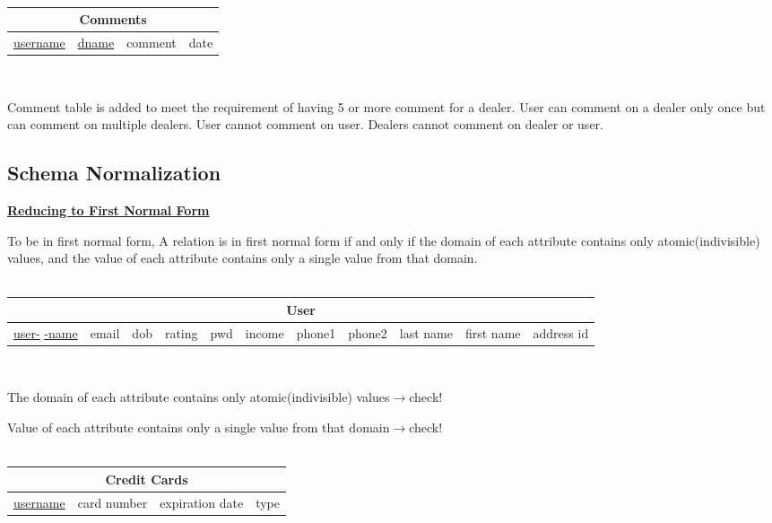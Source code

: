 \documentclass[12pt]{article}
\begin{document}
~\\
\begin{tabularx}{\textwidth}{|X|X|X|X|}
\hline
\multicolumn{4}{|c|}{\cellcolor{green!25}Comments}\\\hline
\cellcolor{green!25}\underline{username} & \cellcolor{green!25}\underline{dname} & \cellcolor{green!25}comment & \cellcolor{green!25}date\\\hline
\end{tabularx}
~\\
\par Comment table is added to meet the requirement of having 5 or more comment for a dealer. User can comment on a dealer only once but can comment on multiple dealers. User cannot comment on user. Dealers cannot comment on dealer or user.
\subsection{Schema Normalization}
\par \textbf{\underline{Reducing to First Normal Form}}
\par To be in first normal form, A relation is in first normal form if and only if the domain of each attribute contains only atomic(indivisible) values, and the value of each attribute contains only a single value from that domain.\\\\
\begin{tabularx}{\textwidth}{|X|X|X|X|X|X|X|X|X|X|X|}
\hline
\multicolumn{11}{|c|}{User}\\\hline
\scriptsize \underline{user-} \underline{-name} & \scriptsize email & \scriptsize\cellcolor{green!25}dob & \scriptsize rating & \scriptsize pwd & \scriptsize income & \scriptsize\cellcolor{green!25} phone1 & \scriptsize\cellcolor{green!25} phone2 & \scriptsize\cellcolor{green!25} last name & \scriptsize\cellcolor{green!25} first name & \scriptsize\cellcolor{green!25} address id\\\hline
\end{tabularx}
~\\
\par The domain of each attribute contains only atomic(indivisible) values\hfill $\rightarrow$check!
\par Value of each attribute contains only a single value from that domain\hfill $\rightarrow$check!\\
~\\
\begin{tabularx}{\textwidth}{|X|X|X|X|}
\hline
\multicolumn{4}{|c|}{Credit Cards}\\\hline
\underline{username} & card number & expiration date & type\\\hline
\end{tabularx}
\end{document}
